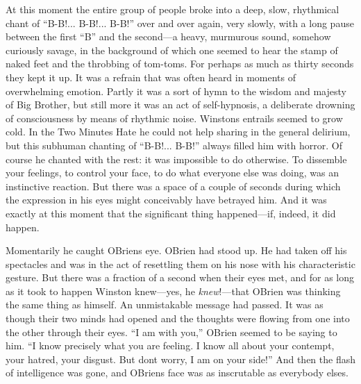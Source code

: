 At this moment the entire group of people broke into a deep, slow,
rhythmical chant of ``B-B!... B-B!... B-B!'' over and over again, very
slowly, with a long pause between the first ``B'' and the second---a
heavy, murmurous sound, somehow curiously savage, in the background of
which one seemed to hear the stamp of naked feet and the throbbing of
tom-toms. For perhaps as much as thirty seconds they kept it up. It was
a refrain that was often heard in moments of overwhelming emotion.
Partly it was a sort of hymn to the wisdom and majesty of Big Brother,
but still more it was an act of self-hypnosis, a deliberate drowning of
consciousness by means of rhythmic noise. Winston\textquotesingle s
entrails seemed to grow cold. In the Two Minutes Hate he could not help
sharing in the general delirium, but this subhuman chanting of ``B-B!...
B-B!'' always filled him with horror. Of course he chanted with the rest:
it was impossible to do otherwise. To dissemble your feelings, to
control your face, to do what everyone else was doing, was an
instinctive reaction. But there was a space of a couple of seconds
during which the expression in his eyes might conceivably have betrayed
him. And it was exactly at this moment that the significant thing
happened---if, indeed, it did happen.

Momentarily he caught O\textquotesingle Brien\textquotesingle s eye.
O\textquotesingle Brien had stood up. He had taken off his spectacles
and was in the act of resettling them on his nose with his
characteristic gesture. But there was a fraction of a second when their
eyes met, and for as long as it took to happen Winston knew---yes, he
\emph{knew}!---that O\textquotesingle Brien was thinking the same thing
as himself. An unmistakable message had passed. It was as though their
two minds had opened and the thoughts were flowing from one into the
other through their eyes. ``I am with you,'' O\textquotesingle Brien
seemed to be saying to him. ``I know precisely what you are feeling. I
know all about your contempt, your hatred, your disgust. But
don\textquotesingle t worry, I am on your side!'' And then the flash of
intelligence was gone, and O\textquotesingle Brien\textquotesingle s
face was as inscrutable as everybody else\textquotesingle s.


